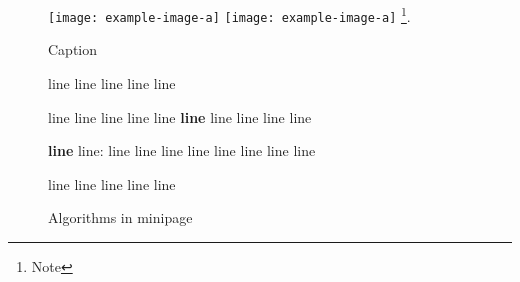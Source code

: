 \documentclass{article}
\begin{document}
\begin{figure}
  \texttt{[image: example-image-a]}\hspace{2cm}%
  \texttt{[image: example-image-a]}%
  \footnote{Note}.
  \caption{Caption}
\end{figure}
\clearpage

\begin{figure*}[tb]
  \begin{minipage}{0.56\textwidth}

  \vspace{-10px}
  \begin{algorithm}[H]
    \caption{Algorithms in minipage}
    \label{alg:main}
  \begin{algorithmic}[1]
    \REQUIRE line
    \STATE line
    \STATE line
    \STATE line
    \STATE line


      \STATE line
      \STATE line
    \ENDFOR
    \STATE
    \STATE line
      \STATE line
        \STATE line
        \STATE \textbf{line}
        \STATE \hspace{16px} line
        \STATE \hspace{16px} line
        \STATE \hspace{16px} line
        \STATE \hspace{16px} line

        \STATE \textbf{line} line:
        \STATE \hspace{16px} line
        \STATE \hspace{16px} line
        \STATE \hspace{16px} line
        \STATE \hspace{16px} line
        \STATE \hspace{16px} \hspace{16px} line
        \STATE \hspace{16px} \hspace{16px} line
        \STATE \hspace{16px} line
        \STATE \hspace{16px} line

      \ENDWHILE
      \STATE
      \STATE line
      \STATE line 
      \STATE line
      \STATE line
    \ENDWHILE
    \STATE
      \STATE line
    \ENDFOR


\end{algorithmic}
\end{algorithm}
\end{minipage}
\end{figure*}
\end{document}
